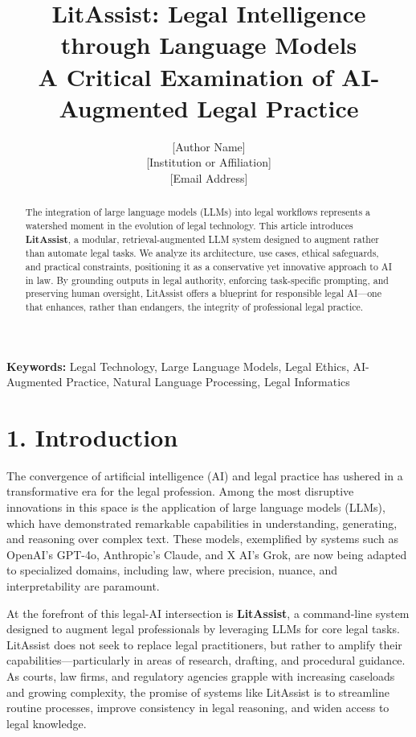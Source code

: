 \documentclass[12pt,a4paper]{article}
\title{\textbf{LitAssist: Legal Intelligence through Language Models} \\ \large A Critical Examination of AI-Augmented Legal Practice}
\author{[Author Name]\\
\small [Institution or Affiliation] \\
\small [Email Address]}
\date{}
\begin{document}
\maketitle

\begin{abstract}
\noindent
The integration of large language models (LLMs) into legal workflows represents a watershed moment in the evolution of legal technology. This article introduces \textbf{LitAssist}, a modular, retrieval-augmented LLM system designed to augment rather than automate legal tasks. We analyze its architecture, use cases, ethical safeguards, and practical constraints, positioning it as a conservative yet innovative approach to AI in law. By grounding outputs in legal authority, enforcing task-specific prompting, and preserving human oversight, LitAssist offers a blueprint for responsible legal AI—one that enhances, rather than endangers, the integrity of professional legal practice.
\end{abstract}

\vspace{1em}
\noindent \textbf{Keywords:} Legal Technology, Large Language Models, Legal Ethics, AI-Augmented Practice, Natural Language Processing, Legal Informatics

\section*{1. Introduction}

The convergence of artificial intelligence (AI) and legal practice has ushered in a transformative era for the legal profession. Among the most disruptive innovations in this space is the application of large language models (LLMs), which have demonstrated remarkable capabilities in understanding, generating, and reasoning over complex text. These models, exemplified by systems such as OpenAI's GPT-4o, Anthropic's Claude, and X AI's Grok, are now being adapted to specialized domains, including law, where precision, nuance, and interpretability are paramount.

At the forefront of this legal-AI intersection is \textbf{LitAssist}, a command-line system designed to augment legal professionals by leveraging LLMs for core legal tasks. LitAssist does not seek to replace legal practitioners, but rather to amplify their capabilities—particularly in areas of research, drafting, and procedural guidance. As courts, law firms, and regulatory agencies grapple with increasing caseloads and growing complexity, the promise of systems like LitAssist is to streamline routine processes, improve consistency in legal reasoning, and widen access to legal knowledge.
\end{document}
